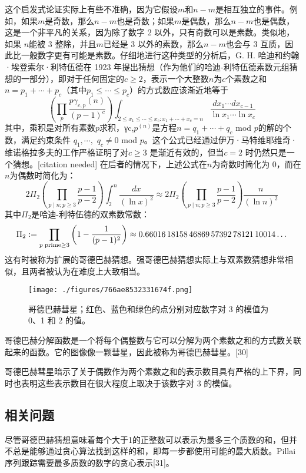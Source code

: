 这个启发式论证实际上有些不准确，因为它假设\(m\)和\(n-m\)是相互独立的事件。例如，如果\(m\)是奇数，那么\(n-m\)也是奇数；如果\(m\)是偶数，那么\(n-m\)也是偶数，这是一个非平凡的关系，因为除了数字 2 以外，只有奇数可以是素数。类似地，如果 \(n\)能被 3 整除，并且\(m\)已经是 3 以外的素数，那么\(n-m\)也会与 3 互质，因此比一般数字更有可能是素数。仔细地进行这种类型的分析后，G. H. 哈迪和约翰·埃登索尔·利特伍德在 1923 年提出猜想（作为他们的哈迪-利特伍德素数元组猜想的一部分），即对于任何固定的\(c\ge2\)，表示一个大整数\(n\)为\(c\)个素数之和\(n = p_1+\cdots +p_c\)（其中\(p_1 \leq \cdots \leq p_c\)）的方式数应该渐近地等于
\[
\left(\prod _{p}{\frac {p\gamma _{c,p}(n)}{(p-1)^{c}}}\right)\int _{2\leq x_{1}\leq \cdots \leq x_{c}:x_{1}+\cdots +x_{c}=n}{\frac {dx_{1}\cdots dx_{c-1}}{\ln x_{1}\cdots \ln x_{c}}}~
\]
其中，乘积是对所有素数\(p\)求积，γc,\(p^{(n)}\)是方程\(n = q_1 + \cdots + q_c\) mod \(p\)的解的个数，满足约束条件 \(q_1,\cdots,\) \(q_c\ne0\) mod \(p\)。这个公式已经通过伊万·马特维耶维奇·维诺格拉多夫的工作严格证明了对\(c\ge3\) 是渐近有效的，但当\(c=2\) 时仍然只是一个猜想。[citation needed] 在后者的情况下，上述公式在\(n\)为奇数时简化为 0，而在\(n\)为偶数时简化为：
\[
2\Pi _{2}\left(\prod _{p\mid n;p\geq 3}{\frac {p-1}{p-2}}\right)\int _{2}^{n}{\frac {dx}{(\ln x)^{2}}}\approx 2\Pi _{2}\left(\prod _{p\mid n;p\geq 3}{\frac {p-1}{p-2}}\right){\frac {n}{(\ln n)^{2}}}~
\]
其中\(\Pi _{2}\)是哈迪-利特伍德的双素数常数：
\[
\Pi _{2}:=\prod _{p\;{\rm {prime}}\geq 3}\left(1-{\frac {1}{(p-1)^{2}}}\right)\approx 0.66016\,18158\,46869\,57392\,78121\,10014\dots~
\]
这有时被称为扩展的哥德巴赫猜想。强哥德巴赫猜想实际上与双素数猜想非常相似，且两者被认为在难度上大致相当。
\begin{figure}[ht]
\centering
\texttt{[image: ./figures/766ae8532331674f.png]}
\caption{哥德巴赫彗星；红色、蓝色和绿色的点分别对应数字对 3 的模值为 0、1 和 2 的值。} \label{fig_GDBHCX_4}
\end{figure}
哥德巴赫分解函数是一个将每个偶整数与它可以分解为两个素数之和的方式数关联起来的函数。它的图像像一颗彗星，因此被称为哥德巴赫彗星。[30]

哥德巴赫彗星暗示了关于偶数作为两个素数之和的表示数目具有严格的上下界，同时也表明这些表示数目在很大程度上取决于该数字对 3 的模值。
\subsection{相关问题}  
尽管哥德巴赫猜想意味着每个大于1的正整数可以表示为最多三个质数的和，但并不总是能够通过贪心算法找到这样的和，即每一步都使用可能的最大质数。Pillai序列跟踪需要最多质数的数字的贪心表示[31]。

